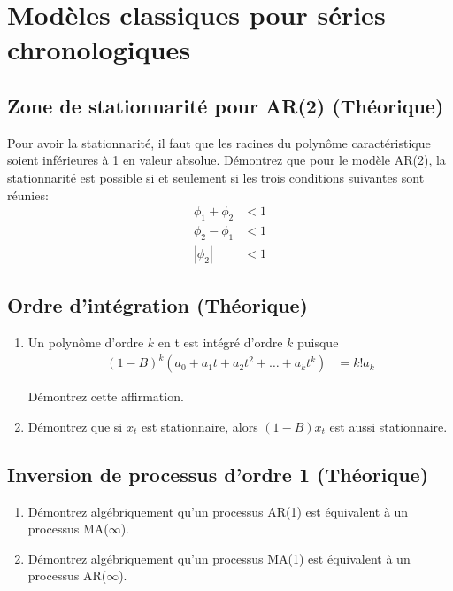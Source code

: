 \documentclass[11pt,english,francais]{article}
\begin{document}
\addtocounter{section}{1}

\section{Modèles classiques pour séries chronologiques}

\subsection{Zone de stationnarité pour AR(2) (Théorique)}
\label{sec:zone-de-stat}


Pour avoir la stationnarité, il faut que les racines du polynôme caractéristique soient inférieures à 1 en valeur absolue. Démontrez que pour le modèle AR(2), la stationnarité est possible si et seulement si les trois conditions suivantes sont réunies:
\begin{align*}
  \phi_1 + \phi_2 &< 1 \\
  \phi_2 - \phi_1 &< 1 \\
  |\phi_2| &< 1
\end{align*}

\subsection{Ordre d'intégration (Théorique)}
\label{sec:ordre-dintegration}

\begin{enumerate}
\item 
Un polynôme d'ordre $k$ en t est intégré d'ordre $k$ puisque
\begin{align*}
  (1-B)^k(a_0+a_1t+a_2t^2+\ldots+a_kt^k) &= k!a_k 
\end{align*}

Démontrez cette affirmation.
\item 

Démontrez que si $x_t$ est stationnaire, alors $(1-B)x_t$ est aussi stationnaire.
\end{enumerate}

\subsection{Inversion de processus d'ordre 1 (Théorique)}
\label{sec:invers-de-proc}

\begin{enumerate}
\item 
Démontrez algébriquement qu'un processus AR(1) est équivalent à un processus MA($\infty$).

\item 
Démontrez algébriquement qu'un processus MA(1) est équivalent à un processus AR($\infty$).
\end{enumerate}
\end{document}

